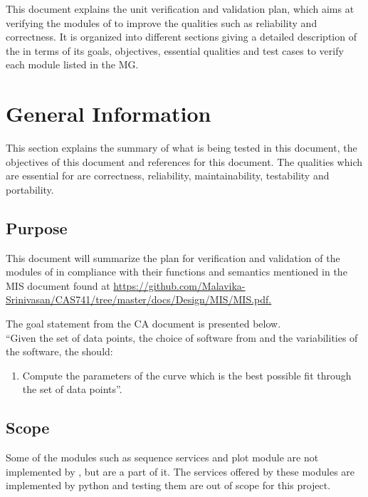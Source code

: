 \documentclass[12pt, titlepage]{article}
\begin{document}
\newpage



This document explains the unit verification and validation plan, which aims at 
verifying the modules of \famname{} to improve the qualities such as 
reliability and correctness. It is organized into different 
sections giving a detailed description of the \famname{} in terms of its 
goals, objectives, essential qualities and test cases to verify each module 
listed in the MG. 



\section{General Information}

This section explains the summary of what is being tested in this document, the 
objectives of this document and references for this document. The qualities 
which are essential for \famname{} are correctness, reliability, 
maintainability, testability and portability.


\subsection{Purpose}

This document will summarize the plan for verification and validation of the 
modules of \famname{} in compliance with their functions and semantics 
mentioned in the MIS document found at 
\url{https://github.com/Malavika-Srinivasan/CAS741/tree/master/docs/Design/MIS/MIS.pdf.}

The goal statement from the CA document is presented below.\\
\noindent ``Given the set of data points, the choice of software from 
\famname{} and the variabilities of the software, the \famname{} should:

\begin{enumerate}
	
	\item Compute the parameters of the curve which is the best possible fit 
	through the set of data points''.
\end{enumerate}


\subsection{Scope}

Some of the modules such as sequence services and plot module are not 
implemented by \famname{}, but are a part of it. The services offered by these 
modules are implemented by python and testing them are out of scope for this 
project.
\end{document}
